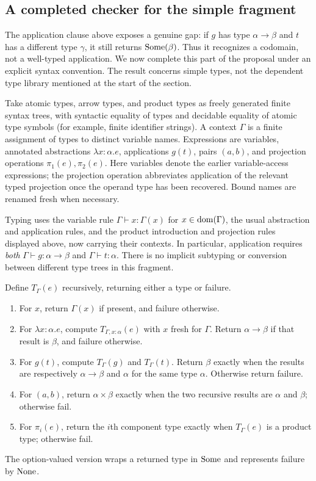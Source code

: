 \subsection{A completed checker for the simple fragment}
The application clause above exposes a genuine gap: if $g$ has type
$\alpha\to\beta$ and $t$ has a different type $\gamma$, it still returns
$\mathrm{Some}(\beta)$. Thus it recognizes a codomain, not a well-typed
application. We now complete this part of the proposal under an explicit
syntax convention. The result concerns simple types, not the dependent
type library mentioned at the start of the section.

Take atomic types, arrow types, and product types as freely generated
finite syntax trees, with syntactic equality of types and decidable equality
of atomic type symbols (for example, finite identifier strings). A context $\Gamma$
is a finite assignment of types to distinct variable names. Expressions
are variables, annotated abstractions $\lambda x:\alpha.e$, applications
$g(t)$, pairs $(a,b)$, and projection operations $\pi_1(e),\pi_2(e)$.
Here variables denote the earlier variable-access expressions; the
projection operation abbreviates application of the relevant typed
projection once the operand type has been recovered. Bound names are
renamed fresh when necessary.

Typing uses the variable rule $\Gamma\vdash x:\Gamma(x)$ for
$x\in\mathrm{dom}(\Gamma)$, the usual abstraction and application rules,
and the product introduction and projection rules displayed above,
now carrying their contexts. In particular, application requires
\emph{both} $\Gamma\vdash g:\alpha\to\beta$ and
$\Gamma\vdash t:\alpha$. There is no implicit subtyping or conversion
between different type trees in this fragment.

\begin{definition}
Define $T_\Gamma(e)$ recursively, returning either a type or failure.
\begin{enumerate}
\item For $x$, return $\Gamma(x)$ if present, and failure otherwise.
\item For $\lambda x:\alpha.e$, compute $T_{\Gamma,x:\alpha}(e)$
with $x$ fresh for $\Gamma$. Return $\alpha\to\beta$ if that result
is $\beta$, and failure otherwise.
\item For $g(t)$, compute $T_\Gamma(g)$ and $T_\Gamma(t)$.
Return $\beta$ exactly when the results are respectively
$\alpha\to\beta$ and $\alpha$ for the same type $\alpha$.
Otherwise return failure.
\item For $(a,b)$, return $\alpha\times\beta$ exactly when the two
recursive results are $\alpha$ and $\beta$; otherwise fail.
\item For $\pi_i(e)$, return the $i$th component type exactly when
$T_\Gamma(e)$ is a product type; otherwise fail.
\end{enumerate}
The option-valued version wraps a returned type in $\mathrm{Some}$ and represents
failure by $\mathrm{None}$.
\end{definition}

